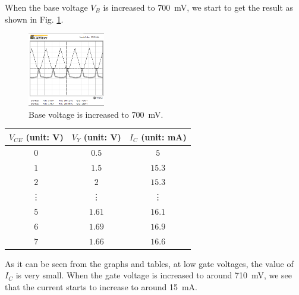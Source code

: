 \documentclass[journal]{IEEEtran}
\begin{document}
\subsubsection{}
\par When the base voltage $V_{B}$ is increased to \SI{700}{\mV}, we start to get the result
as shown in Fig. \ref{fig-3-3}.
\begin{figure}[h]
  \centering
  \includegraphics[width=0.3\textwidth]{images/3-3.png}
  \caption{Base voltage is increased to \SI{700}{\mV}.}
  \label{fig-3-3}
\end{figure}
\begin{center}
    \begin{tabular}{ |c|c|c| }
        \hline
        $V_{CE}$ (unit: \si{\volt}) & $V_{Y}$ (unit: \si{\volt})&  $I_{C}$ (unit: \si{\mA})\\
        \hline
        $0$ & $0.5$ & $5$ \\
        \hline
        $1$ & $1.5$ & $15.3$ \\
        \hline
        $2$ & $2$ & $15.3$ \\
        \hline
        \vdots & \vdots & \vdots \\
        \hline
        $5$ & $1.61$ & $16.1$ \\
        \hline
        $6$ & $1.69$ & $16.9$ \\
        \hline
        $7$ & $1.66$ & $16.6$ \\
        \hline
    \end{tabular}
\end{center}
\par As it can be seen from the graphs and tables, at low gate voltages, the value of $I_{C}$ is very small.
When the gate voltage is increased to around \SI{710}{\mV}, we see that the current starts to increase to around \SI{15}{\mA}.
\end{document}

